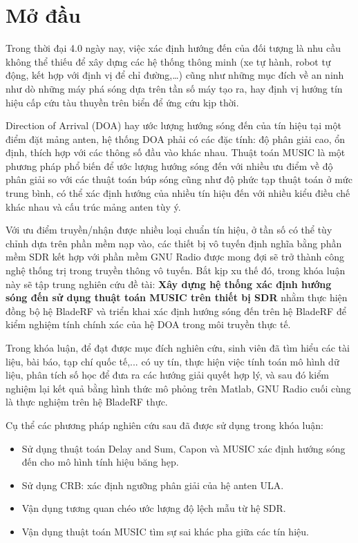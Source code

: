 \clearpage
{}

\chapter*{Mở đầu}

Trong thời đại 4.0 ngày nay, việc xác định hướng đến của đối tượng là nhu cầu không thể thiếu để xây dựng các hệ thống thông minh (xe tự hành, robot tự động, kết hợp với định vị để chỉ đường,…) cũng như những mục đích về an ninh như dò những máy phá sóng dựa trên tần số máy tạo ra, hay định vị hướng tín hiệu cấp cứu tàu thuyền trên biển để ứng cứu kịp thời.

Direction of Arrival (DOA) hay ước lượng hướng sóng đến của tín hiệu tại một điểm đặt mảng anten, hệ thống DOA phải có các đặc tính: độ phân giải cao, ổn định, thích hợp với các thông số đầu vào khác nhau. Thuật toán MUSIC là một phương pháp phổ biến để ước lượng hướng sóng đến với nhiều ưu điểm về độ phân giải so với các thuật toán búp sóng cũng như độ phức tạp thuật toán ở mức trung bình, có thể xác định hướng của nhiều tín hiệu đến với nhiều kiểu điều chế khác nhau và cấu trúc mảng anten tùy ý.

Với ưu điểm truyền/nhận được nhiều loại chuẩn tín hiệu, ở tần số có thể tùy chỉnh dựa trên phần mềm nạp vào, các thiết bị vô tuyến định nghĩa bằng phần mềm SDR kết hợp với phần mềm GNU Radio được mong đợi sẽ trở thành công nghệ thống trị trong truyền thông vô tuyến. Bắt kịp xu thế đó, trong khóa luận này sẽ tập trung nghiên cứu đề tài: \textbf{Xây dựng hệ thống xác định hướng sóng đến sử dụng thuật toán MUSIC trên thiết bị SDR} nhằm thực hiện đồng bộ hệ BladeRF và triển khai xác định hướng sóng đến trên hệ BladeRF để kiểm nghiệm tính chính xác của hệ DOA trong môi truyền thực tế.
\vspace{0.5cm}


Trong khóa luận, để đạt được mục đích nghiên cứu, sinh viên đã tìm
hiểu các tài liệu, bài báo, tạp chí quốc tế,... có uy tín, thực hiện việc tính toán mô hình dữ liệu, phân tích số học để đưa ra các hướng giải quyết hợp lý, và sau đó kiểm nghiệm lại kết quả bằng hình thức mô phỏng trên Matlab, GNU Radio cuối cùng là thực nghiệm trên hệ BladeRF thực.

Cụ thể các phương pháp nghiên cứu sau đã được sử dụng trong khóa luận:

\renewcommand{\labelitemi}{$-$}
\begin{itemize}
	\item Sử dụng thuật toán Delay and Sum, Capon và MUSIC xác định hướng sóng đến cho mô hình tính hiệu băng hẹp.
	\item Sử dụng CRB: xác định ngưỡng phân giải của hệ anten ULA.
	\item Vận dụng tương quan chéo ước lượng độ lệch mẫu từ hệ SDR.
	\item Vận dụng thuật toán MUSIC tìm sự sai khác pha giữa các tín hiệu.
\end{itemize} 
\vspace{0.3cm}

